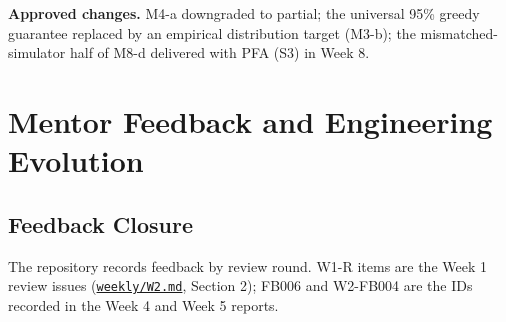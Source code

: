 \documentclass[english]{sintr}
\newcommand{\repourl}{https://github.com/Bhuvan-56/adaptive-learning-path-planner-DAT}
\newcommand{\sha}{cs5903-final-2026}
\DeclareRobustCommand{\rf}[1]{\href{\repourl/blob/\sha/#1}{\nolinkurl{#1}}}
\begin{document}
\textbf{Approved changes.} M4-a downgraded to partial; the universal 95\% greedy guarantee replaced by an empirical distribution target (M3-b); the mismatched-simulator half of M8-d delivered with PFA (S3) in Week 8.

\section{Mentor Feedback and Engineering Evolution}
\subsection{Feedback Closure}
The repository records feedback by review round. W1-R items are the Week 1 review issues (\rf{weekly/W2.md}, Section 2); FB006 and W2-FB004 are the IDs recorded in the Week 4 and Week 5 reports.
\end{document}
